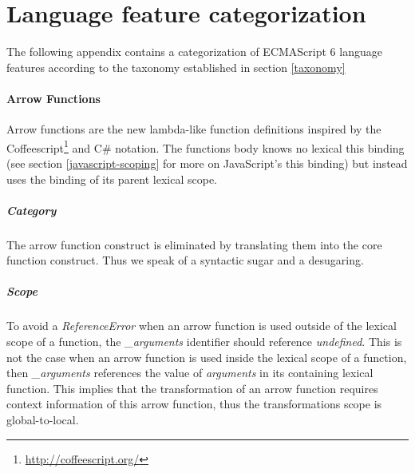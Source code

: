 
\chapter{Language feature categorization} %

\label{AppendixB} %


The following appendix contains a categorization of ECMAScript 6 language features according to the taxonomy established in section \ref{taxonomy}

\subsubsection{Arrow Functions}
Arrow functions\cite[14.2]{SpecJS} are the new lambda-like function definitions inspired by the Coffeescript\footnote{\url{http://coffeescript.org/}} and C\# notation. The functions body knows no lexical this binding (see section \ref{javascript-scoping} for more on JavaScript's this binding) but instead uses the binding of its parent lexical scope.

\paragraph{Category}
The arrow function construct is eliminated by translating them into the core function construct. Thus we speak of a syntactic sugar and a desugaring.

\paragraph{Scope}
To avoid a \textit{ReferenceError} when an arrow function is used outside of the lexical scope of a function, the \textit{\_arguments} identifier should reference \textit{undefined}. This is not the case when an arrow function is used inside the lexical scope of a function, then \textit{\_arguments} references the value of \textit{arguments} in its containing lexical function. This implies that the transformation of an arrow function requires context information of this arrow function, thus the transformations scope is global-to-local.

